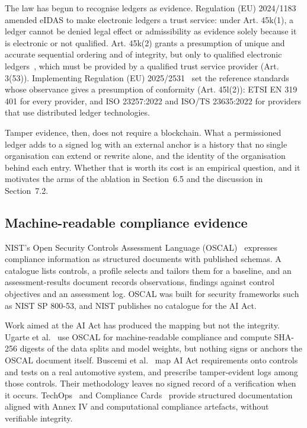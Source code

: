 The law has begun to recognise ledgers as evidence. Regulation (EU) 2024/1183~\cite{eidas_2024} amended eIDAS to make electronic ledgers a trust service: under Art. 45k(1), a ledger cannot be denied legal effect or admissibility as evidence solely because it is electronic or not qualified. Art. 45k(2) grants a presumption of unique and accurate sequential ordering and of integrity, but only to qualified electronic ledgers~\cite{alamillo2024}, which must be provided by a qualified trust service provider (Art. 3(53)). Implementing Regulation (EU) 2025/2531~\cite{qel_2025} set the reference standards whose observance gives a presumption of conformity (Art. 45l(2)): ETSI EN 319 401 for every provider, and ISO 23257:2022 and ISO/TS 23635:2022 for providers that use distributed ledger technologies.

Tamper evidence, then, does not require a blockchain. What a permissioned ledger adds to a signed log with an external anchor is a history that no single organisation can extend or rewrite alone, and the identity of the organisation behind each entry. Whether that is worth its cost is an empirical question, and it motivates the arms of the ablation in Section~6.5 and the discussion in Section~7.2.

\subsection{Machine-readable compliance evidence}

NIST's Open Security Controls Assessment Language (OSCAL)~\cite{oscal} expresses compliance information as structured documents with published schemas. A catalogue lists controls, a profile selects and tailors them for a baseline, and an assessment-results document records observations, findings against control objectives and an assessment log. OSCAL was built for security frameworks such as NIST SP 800-53, and NIST publishes no catalogue for the AI Act.

Work aimed at the AI Act has produced the mapping but not the integrity. Ugarte et al.~\cite{ugarte2026} use OSCAL for machine-readable compliance and compute SHA-256 digests of the data splits and model weights, but nothing signs or anchors the OSCAL document itself. Buscemi et al.~\cite{buscemi2026} map AI Act requirements onto controls and tests on a real automotive system, and prescribe tamper-evident logs among those controls. Their methodology leaves no signed record of a verification when it occurs. TechOps~\cite{lucaj2025} and Compliance Cards~\cite{marino2024} provide structured documentation aligned with Annex IV and computational compliance artefacts, without verifiable integrity.

